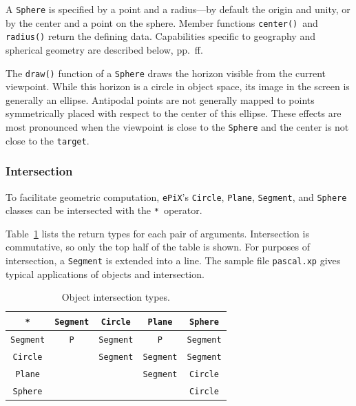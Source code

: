 \documentclass[12pt,letterpaper]{book}
\newcommand{\code}[1]{\texttt{#1}}
\newcommand{\filename}[1]{\texttt{#1}}
\newcommand{\ePiX}{\code{ePiX}}
\newcommand{\texicomment}{}
\newcommand{\texicommentend}{}
\newcommand{\findex}[1]{\ignorespaces}
\begin{document}
\findex{Sphere}
A \code{Sphere} is specified by a point and a radius---by default the
origin and unity, or by the center and a point on the sphere. Member
functions \code{center()}~and \code{radius()} return the defining
data.  Capabilities specific to geography and spherical geometry are
described below, pp.~\pageref{non-eucl}ff.

The \code{draw()} function of a \code{Sphere} draws the horizon
visible from the current viewpoint. While this horizon is a circle in
object space, its image in the screen is generally an ellipse.
Antipodal points are not generally mapped to points symmetrically
placed with respect to the center of this ellipse. These effects are
most pronounced when the viewpoint is close to the \code{Sphere} and
the center is not close to the \code{target}.


\subsubsection*{Intersection}


To facilitate geometric computation, \ePiX's \code{Circle},
\code{Plane}, \code{Segment}, and \code{Sphere} classes can be
intersected with the \code{*}~operator.
\texicomment
Table~\ref{table-intersect}
lists the return types for each pair of arguments.  Intersection is
commutative, so only the top half of the table is shown. For purposes
of intersection, a \code{Segment} is extended into a line.
The sample file \filename{pascal.xp} gives typical applications of
objects and intersection.
\findex{intersection}
\begin{table}[hbt]
\begin{center}
  \begin{tabular}{c|cccc}
    \code{*} & 
    \code{Segment} & \code{Circle} & \code{Plane} & \code{Sphere} \\
    \hline
    \code{Segment} & \code{P} & \code{Segment} & \code{P} & \code{Segment} \\
    \code{Circle}  &    & \code{Segment} & \code{Segment} & \code{Segment} \\
    \code{Plane}   &    &    &   \code{Segment} & \code{Circle} \\
    \code{Sphere}  &    &    &    & \code{Circle}
  \end{tabular}
  \caption{Object intersection types.}
  \label{table-intersect}
\end{center}
\end{table}
\texicommentend
\end{document}
